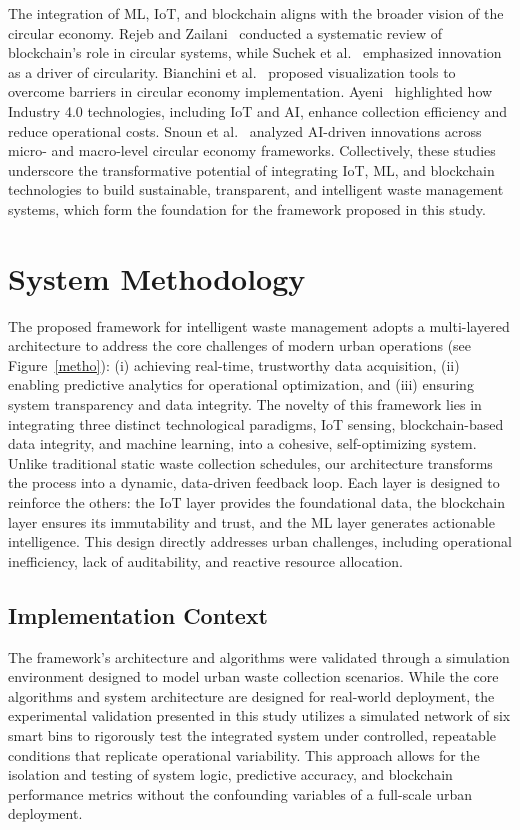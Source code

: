 \documentclass[final,5p,times,twocolumn]{elsarticle}
\begin{document}
The integration of ML, IoT, and blockchain aligns with the broader vision of the circular economy. Rejeb and Zailani~\cite{rejeb2023blockchain} conducted a systematic review of blockchain’s role in circular systems, while Suchek et al.~\cite{suchek2021innovation} emphasized innovation as a driver of circularity. Bianchini et al.~\cite{bianchini2019overcoming} proposed visualization tools to overcome barriers in circular economy implementation. Ayeni~\cite{ayeni2025} highlighted how Industry 4.0 technologies, including IoT and AI, enhance collection efficiency and reduce operational costs. Snoun et al.~\cite{snoun2025} analyzed AI-driven innovations across micro- and macro-level circular economy frameworks. Collectively, these studies underscore the transformative potential of integrating IoT, ML, and blockchain technologies to build sustainable, transparent, and intelligent waste management systems, which form the foundation for the framework proposed in this study.

\section{System Methodology}
\label{sec3}
The proposed framework for intelligent waste management adopts a multi-layered architecture to address the core challenges of modern urban operations (see Figure~\ref{metho}): (i) achieving real-time, trustworthy data acquisition, (ii) enabling predictive analytics for operational optimization, and (iii) ensuring system transparency and data integrity. The novelty of this framework lies in integrating three distinct technological paradigms, IoT sensing, blockchain-based data integrity, and machine learning, into a cohesive, self-optimizing system. Unlike traditional static waste collection schedules, our architecture transforms the process into a dynamic, data-driven feedback loop. Each layer is designed to reinforce the others: the IoT layer provides the foundational data, the blockchain layer ensures its immutability and trust, and the ML layer generates actionable intelligence. This design directly addresses urban challenges, including operational inefficiency, lack of auditability, and reactive resource allocation.

\subsection{Implementation Context}
The framework's architecture and algorithms were validated through a simulation environment designed to model urban waste collection scenarios. While the core algorithms and system architecture are designed for real-world deployment, the experimental validation presented in this study utilizes a simulated network of six smart bins to rigorously test the integrated system under controlled, repeatable conditions that replicate operational variability. This approach allows for the isolation and testing of system logic, predictive accuracy, and blockchain performance metrics without the confounding variables of a full-scale urban deployment.
\end{document}
